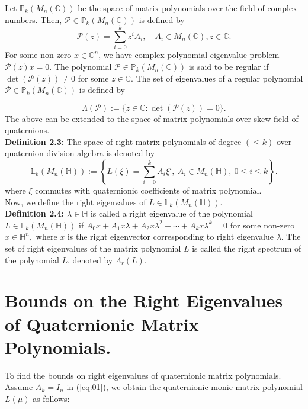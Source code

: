 \documentclass [12pt]{article}
\begin{document}
    
 \noindent
 
 
 
 
 
 Let \( \mathbb{P}_k(M_n(\mathbb{C})) \) be the space of matrix polynomials over the field of complex numbers. Then, \( \mathcal{P} \in \mathbb{P}_k(M_n(\mathbb{C})) \) is defined by  
\[\mathcal{P}(z) = \sum_{i=0}^k z^i A_i, \quad A_i \in M_n(\mathbb{C}), z \in \mathbb{C}.\]  
For some non zero \( x \in \mathbb{C}^n \), we have complex polynomial eigenvalue problem \( \mathcal{P}(z)x = 0 \). The polynomial \( \mathcal{P} \in \mathbb{P}_k(M_n(\mathbb{C})) \) is said to be regular if \( \det(\mathcal{P}(z)) \neq 0 \) for some \( z \in \mathbb{C} \). The set of eigenvalues of a regular polynomial \( \mathcal{P} \in \mathbb{P}_k(M_n(\mathbb{C})) \) is defined by  

\[\Lambda(\mathcal{P}) := \{ z \in \mathbb{C} : \det(\mathcal{P}(z)) = 0 \}.\]
 The above can be extended to the space of matrix polynomials over skew field of quaternions.\\



\noindent\textbf{Definition 2.3:} The space of right matrix polynomials of degree $(\leq k)$ over quaternion division algebra is denoted by \begin{equation}
    \mathbb{L}_{k}(M_n(\mathbb{H})) :=\left\{ L(\xi)=\sum\limits_{i=0}^{k} A_{i}\xi^{i} ,~ A_{i} \in M_{n}(\mathbb{H}),~ 0\leq i \leq k \right\}.\label{eq:01}
\end{equation}
where  $\xi$ commutes with quaternionic coefficients of matrix polynomial.\\
 \noindent Now, we define the right eigenvalues of $L\in\mathbb{L}_{k}(M_n(\mathbb{H})).$\\
 
 \noindent\textbf{Definition 2.4:} $\lambda\in\mathbb{H}$ is called a right eigenvalue of the polynomial $L \in\mathbb{L}_{k}(M_n(\mathbb{H}))$  if $A_0x+A_{1}x \lambda +A_{2}x \lambda^{2} +\cdots+A_{k}x\lambda^{k}=0$ for some non-zero $x\in\mathbb{H}^{n},$ where $x$ is the right eigenvector corresponding to right eigenvalue $\lambda.$ The set of right eigenvalues of the matrix polynomial $L$ is called the right spectrum of the polynomial $L$, denoted by $\Lambda_{r}{(L)}.$
\section{Bounds on the Right Eigenvalues of Quaternionic Matrix Polynomials.}
To find the bounds on right eigenvalues of quaternionic matrix polynomials. Assume $A_k = I_n$ in (\ref{eq:01}), we obtain the quaternionic monic matrix polynomial ${L}(\mu)$ as follows:
\end{document}
